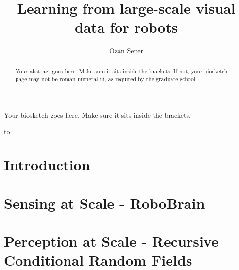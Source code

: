 \documentclass[phd,tocprelim]{cornell}
\title {Learning from large-scale visual data for robots}
\author {Ozan \c{S}ener}
\begin{document}
\maketitle
\makecopyright

\begin{abstract}
Your abstract goes here. Make sure it sits inside the brackets. If not,
your biosketch page may not be roman numeral iii, as required by the
graduate school.
\end{abstract}

\begin{biosketch}
Your biosketch goes here. Make sure it sits inside
the brackets.
\end{biosketch}

\begin{dedication}
to 
\end{dedication}

\begin{acknowledgements}
%
\end{acknowledgements}

\contentspage
\tablelistpage
\figurelistpage

\normalspacing \setcounter{page}{1} 
\pagestyle{cornell} \addtolength{\parskip}{0.5\baselineskip}

\chapter{Introduction}


\chapter{Sensing at Scale - RoboBrain}


\chapter{Perception at Scale - Recursive Conditional Random Fields}
\label{rcrf}

\end{document}
